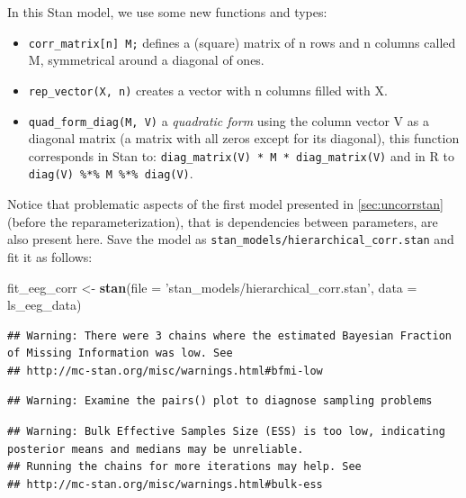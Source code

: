 \documentclass[12pt,]{krantz}
\newenvironment{Shaded}{\begin{snugshade}}{\end{snugshade}}
\newcommand{\KeywordTok}[1]{\textcolor[rgb]{0.13,0.29,0.53}{\textbf{#1}}}
\newcommand{\DataTypeTok}[1]{\textcolor[rgb]{0.13,0.29,0.53}{#1}}
\newcommand{\StringTok}[1]{\textcolor[rgb]{0.31,0.60,0.02}{#1}}
\newcommand{\NormalTok}[1]{#1}
\providecommand{\tightlist}{%
  \setlength{\itemsep}{0pt}\setlength{\parskip}{0pt}}
\theoremstyle{definition}
\theoremstyle{definition}
\theoremstyle{definition}
\theoremstyle{remark}
\begin{document}
In this Stan model, we use some new functions and types:

\begin{itemize}
\tightlist
\item
  \texttt{corr\_matrix{[}n{]}\ M;} defines a (square) matrix of n rows
  and n columns called M, symmetrical around a diagonal of ones.
\item
  \texttt{rep\_vector(X,\ n)} creates a vector with n columns filled
  with X.
\item
  \texttt{quad\_form\_diag(M,\ V)} a \emph{quadratic form} using the
  column vector V as a diagonal matrix (a matrix with all zeros except
  for its diagonal), this function corresponds in Stan to:
  \texttt{diag\_matrix(V)\ *\ M\ *\ diag\_matrix(V)} and in R to
  \texttt{diag(V)\ \%*\%\ M\ \%*\%\ diag(V)}.
\end{itemize}

Notice that problematic aspects of the first model presented in
\ref{sec:uncorrstan} (before the reparameterization), that is
dependencies between parameters, are also present here. Save the model
as \texttt{stan\_models/hierarchical\_corr.stan} and fit it as follows:

\begin{Shaded}
\begin{Highlighting}[]
\NormalTok{fit_eeg_corr <-}\StringTok{ }\KeywordTok{stan}\NormalTok{(}\DataTypeTok{file =} \StringTok{'stan_models/hierarchical_corr.stan'}\NormalTok{, }
                 \DataTypeTok{data =}\NormalTok{ ls_eeg_data)}
\end{Highlighting}
\end{Shaded}

\begin{verbatim}
## Warning: There were 3 chains where the estimated Bayesian Fraction of Missing Information was low. See
## http://mc-stan.org/misc/warnings.html#bfmi-low
\end{verbatim}

\begin{verbatim}
## Warning: Examine the pairs() plot to diagnose sampling problems
\end{verbatim}

\begin{verbatim}
## Warning: Bulk Effective Samples Size (ESS) is too low, indicating posterior means and medians may be unreliable.
## Running the chains for more iterations may help. See
## http://mc-stan.org/misc/warnings.html#bulk-ess
\end{verbatim}
\end{document}
